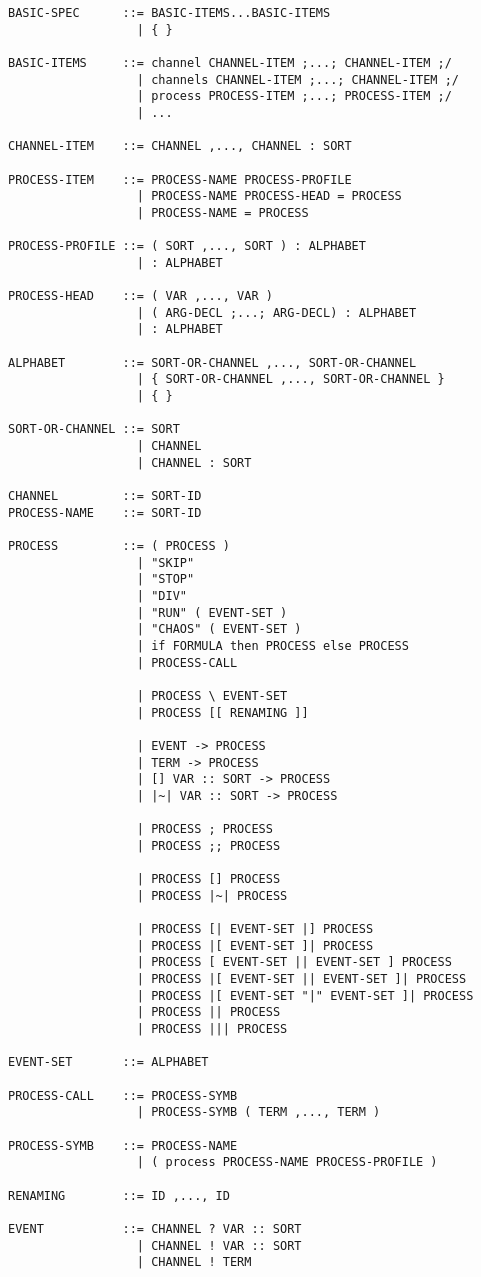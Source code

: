\begin{verbatim}
BASIC-SPEC      ::= BASIC-ITEMS...BASIC-ITEMS
                  | { }

BASIC-ITEMS     ::= channel CHANNEL-ITEM ;...; CHANNEL-ITEM ;/
                  | channels CHANNEL-ITEM ;...; CHANNEL-ITEM ;/
                  | process PROCESS-ITEM ;...; PROCESS-ITEM ;/
                  | ...

CHANNEL-ITEM    ::= CHANNEL ,..., CHANNEL : SORT

PROCESS-ITEM    ::= PROCESS-NAME PROCESS-PROFILE
                  | PROCESS-NAME PROCESS-HEAD = PROCESS
                  | PROCESS-NAME = PROCESS

PROCESS-PROFILE ::= ( SORT ,..., SORT ) : ALPHABET
                  | : ALPHABET

PROCESS-HEAD    ::= ( VAR ,..., VAR )
                  | ( ARG-DECL ;...; ARG-DECL) : ALPHABET
                  | : ALPHABET

ALPHABET        ::= SORT-OR-CHANNEL ,..., SORT-OR-CHANNEL
                  | { SORT-OR-CHANNEL ,..., SORT-OR-CHANNEL }
                  | { }

SORT-OR-CHANNEL ::= SORT
                  | CHANNEL
                  | CHANNEL : SORT

CHANNEL         ::= SORT-ID
PROCESS-NAME    ::= SORT-ID

PROCESS         ::= ( PROCESS )
                  | "SKIP"
                  | "STOP"
                  | "DIV"
                  | "RUN" ( EVENT-SET )
                  | "CHAOS" ( EVENT-SET )
                  | if FORMULA then PROCESS else PROCESS
                  | PROCESS-CALL

                  | PROCESS \ EVENT-SET
                  | PROCESS [[ RENAMING ]]

                  | EVENT -> PROCESS
                  | TERM -> PROCESS
                  | [] VAR :: SORT -> PROCESS
                  | |~| VAR :: SORT -> PROCESS

                  | PROCESS ; PROCESS
                  | PROCESS ;; PROCESS

                  | PROCESS [] PROCESS
                  | PROCESS |~| PROCESS

                  | PROCESS [| EVENT-SET |] PROCESS
                  | PROCESS |[ EVENT-SET ]| PROCESS
                  | PROCESS [ EVENT-SET || EVENT-SET ] PROCESS
                  | PROCESS |[ EVENT-SET || EVENT-SET ]| PROCESS
                  | PROCESS |[ EVENT-SET "|" EVENT-SET ]| PROCESS
                  | PROCESS || PROCESS
                  | PROCESS ||| PROCESS

EVENT-SET       ::= ALPHABET

PROCESS-CALL    ::= PROCESS-SYMB
                  | PROCESS-SYMB ( TERM ,..., TERM )

PROCESS-SYMB    ::= PROCESS-NAME
                  | ( process PROCESS-NAME PROCESS-PROFILE )

RENAMING        ::= ID ,..., ID

EVENT           ::= CHANNEL ? VAR :: SORT
                  | CHANNEL ! VAR :: SORT
                  | CHANNEL ! TERM
\end{verbatim}
